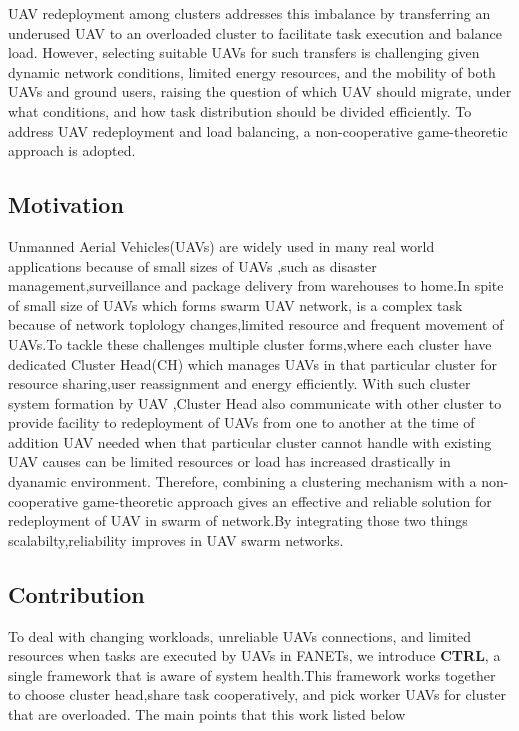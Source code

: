 \documentclass[journal]{IEEEtran}
\begin{document}
UAV redeployment among clusters addresses this imbalance by transferring an underused UAV to an overloaded cluster to facilitate task execution and balance load. However, selecting suitable UAVs for such transfers is challenging given dynamic network conditions, limited energy resources, and the mobility of both UAVs and ground users, raising the question of which UAV should migrate, under what conditions, and how task distribution should be divided efficiently. To address UAV redeployment and load balancing, a non-cooperative game-theoretic approach is adopted.

\subsection{Motivation}
Unmanned Aerial Vehicles(UAVs) are widely used in many real world applications because of small sizes of UAVs ,such as disaster management,surveillance and package delivery from warehouses to home.In spite of small size of UAVs which forms swarm UAV network, is a complex task because of network toplology changes,limited resource and frequent movement of UAVs.To tackle these challenges multiple cluster forms,where each cluster have dedicated Cluster Head(CH) which manages UAVs in that particular cluster for resource sharing,user reassignment and energy efficiently.
With such cluster system formation by UAV ,Cluster Head also communicate with other cluster to provide facility to redeployment of UAVs from one to another at the time of addition UAV needed when that particular cluster cannot handle with existing UAV causes can be limited resources or load has increased drastically in dyanamic environment.
Therefore, combining a clustering mechanism with a non- cooperative game-theoretic approach gives an effective and reliable solution for redeployment of UAV in swarm of network.By integrating those two things scalabilty,reliability improves in UAV swarm networks.


\subsection{Contribution}
To deal with changing workloads, unreliable UAVs connections, and limited resources when tasks are executed by UAVs in FANETs, we introduce \textbf{CTRL}, a single framework that is aware of system health.This framework works together to choose cluster head,share task cooperatively, and pick worker UAVs for cluster that are overloaded. The main points that this work listed below
\end{document}
